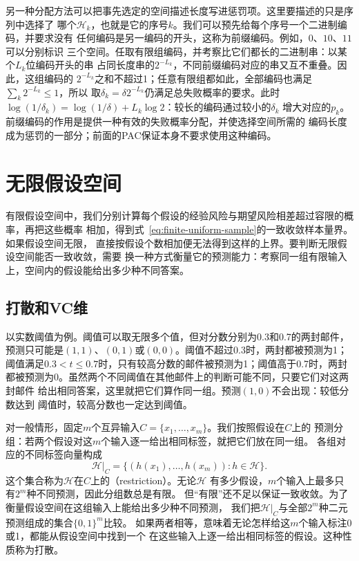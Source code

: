 另一种分配方法可以把事先选定的空间描述长度写进惩罚项。这里要描述的只是序列中选择了
哪个$\mathcal H_k$，也就是它的序号$k$。我们可以预先给每个序号一个二进制编码，并要求没有
任何编码是另一编码的开头，这称为前缀编码。例如，$0$、$10$、$11$可以分别标识
三个空间。任取有限组编码，并考察比它们都长的二进制串：以某个$L_k$位编码开头的串
占同长度串的$2^{-L_k}$，不同前缀编码对应的串又互不重叠。因此，这组编码的
$2^{-L_k}$之和不超过1；任意有限组都如此，全部编码也满足
$\sum_k2^{-L_k}\leq1$，所以
取$\delta_k=\delta2^{-L_k}$仍满足总失败概率的要求。此时
$\log(1/\delta_k)=\log(1/\delta)+L_k\log2$：较长的编码通过较小的$\delta_k$
增大对应的$p_k$。前缀编码的作用是提供一种有效的失败概率分配，并使选择空间所需的
编码长度成为惩罚的一部分；前面的PAC保证本身不要求使用这种编码。

\section{无限假设空间}
\label{sec:binary-infinite-class}

有限假设空间中，我们分别计算每个假设的经验风险与期望风险相差超过容限的概率，再把这些概率
相加，得到式~\eqref{eq:finite-uniform-sample}的一致收敛样本量界。如果假设空间无限，
直接按假设个数相加便无法得到这样的上界。要判断无限假设空间能否一致收敛，需要
换一种方式衡量它的预测能力：考察同一组有限输入上，空间内的假设能给出多少种不同答案。

\subsection{打散和VC维}
\label{sec:binary-shattering-vc}

以实数阈值为例。阈值可以取无限多个值，但对分数分别为0.3和0.7的两封邮件，
预测只可能是$(1,1)$、$(0,1)$或$(0,0)$。阈值不超过0.3时，两封都被预测为1；
阈值满足$0.3<t\leq0.7$时，只有较高分数的邮件被预测为1；阈值高于0.7时，两封
都被预测为0。虽然两个不同阈值在其他邮件上的判断可能不同，只要它们对这两封邮件
给出相同答案，这里就把它们算作同一组。预测$(1,0)$不会出现：较低分数达到
阈值时，较高分数也一定达到阈值。

对一般情形，固定$m$个互异输入$C=\{x_1,\ldots,x_m\}$。我们按照假设在$C$上的
预测分组：若两个假设对这$m$个输入逐一给出相同标签，就把它们放在同一组。
各组对应的不同标签向量构成
\begin{equation}
 \mathcal H|_C=\{(h(x_1),\ldots,h(x_m)):h\in\mathcal H\}.
 \label{eq:hypothesis-restriction}
\end{equation}
这个集合称为$\mathcal H$在$C$上的（restriction）。无论$\mathcal H$
有多少假设，$m$个输入上最多只有$2^m$种不同预测，因此分组数总是有限。
但“有限”还不足以保证一致收敛。为了衡量假设空间在这组输入上能给出多少种不同预测，
我们把$\mathcal H|_C$与全部$2^m$种二元预测组成的集合$\{0,1\}^m$比较。
如果两者相等，意味着无论怎样给这$m$个输入标注0或1，都能从假设空间中找到一个
在这些输入上逐一给出相同标签的假设。这种性质称为打散。

